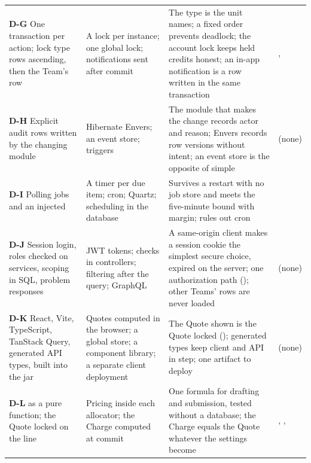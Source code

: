 {\begin{longtable}{@{}L{3.3cm}L{3.5cm}L{\dimexpr\textwidth-8.3cm-6\tabcolsep\relax}L{1.5cm}@{}}
\textbf{D-G} One transaction per action; lock type rows ascending, then the Team's  row & A lock per instance; one global lock; notifications sent after commit & The type is the unit  names; a fixed order prevents deadlock; the account lock keeps held credits honest; an in-app notification is a row written in the same transaction & ,  \\
\textbf{D-H} Explicit audit rows written by the changing module & Hibernate Envers; an event store; triggers & The module that makes the change records actor and reason; Envers records row versions without intent; an event store is the opposite of simple & (none) \\
\textbf{D-I} Polling jobs and an injected  & A timer per due item; cron; Quartz; scheduling in the database & Survives a restart with no job store and meets the five-minute bound with margin;  rules out cron &  \\
\textbf{D-J} Session login, roles checked on services, scoping in SQL, problem responses & JWT tokens; checks in controllers; filtering after the query; GraphQL & A same-origin client makes a session cookie the simplest secure choice, expired on the server; one authorization path (); other Teams' rows are never loaded & (none) \\
\textbf{D-K} React, Vite, TypeScript, TanStack Query, generated API types, built into the jar & Quotes computed in the browser; a global store; a component library; a separate client deployment & The Quote shown is the Quote locked (); generated types keep client and API in step; one artifact to deploy & (none) \\
\textbf{D-L}  as a pure function; the Quote locked on the line & Pricing inside each allocator; the Charge computed at commit & One formula for drafting and submission, tested without a database; the Charge equals the Quote whatever the settings become & , ,  \\
\end{longtable}
}

